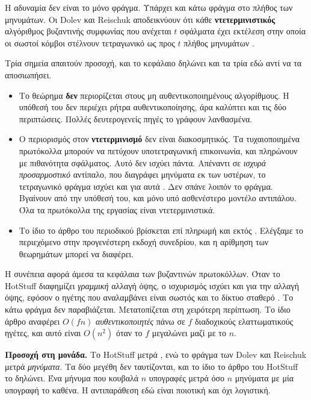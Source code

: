 Η αδυναμία δεν είναι το μόνο φράγμα. Υπάρχει και κάτω φράγμα στο πλήθος
των μηνυμάτων. Οι Dolev και Reischuk αποδεικνύουν ότι κάθε
\textbf{ντετερμινιστικός} αλγόριθμος βυζαντινής συμφωνίας που ανέχεται
$t$ σφάλματα έχει εκτέλεση στην οποία οι σωστοί κόμβοι στέλνουν
τετραγωνικό ως προς $t$ πλήθος μηνυμάτων \cite{dolev1985bounds}.

Τρία σημεία απαιτούν προσοχή, και το κεφάλαιο δηλώνει και τα τρία εδώ
αντί να τα αποσιωπήσει.

\begin{itemize}
  \item Το θεώρημα \textbf{δεν} περιορίζεται στους μη
  αυθεντικοποιημένους αλγορίθμους. Η υπόθεσή του δεν περιέχει ρήτρα
  αυθεντικοποίησης, άρα καλύπτει και τις δύο περιπτώσεις. Πολλές
  δευτερογενείς πηγές το γράφουν λανθασμένα.
  \item Ο περιορισμός στον \textbf{ντετερμινισμό} δεν είναι
  διακοσμητικός. Τα τυχαιοποιημένα πρωτόκολλα μπορούν να πετύχουν
  υποτετραγωνική επικοινωνία, και πληρώνουν με πιθανότητα σφάλματος.
  Αυτό δεν ισχύει πάντα. Απέναντι σε \emph{ισχυρά προσαρμοστικό}
  αντίπαλο, που διαγράφει μηνύματα εκ των υστέρων, το τετραγωνικό φράγμα
  ισχύει και για αυτά \cite{abraham2019ccba}. Δεν σπάνε λοιπόν το
  φράγμα. Βγαίνουν από την υπόθεσή του, και μόνο υπό ασθενέστερο μοντέλο
  αντιπάλου. Όλα τα πρωτόκολλα της εργασίας είναι ντετερμινιστικά.
  \item Το ίδιο το άρθρο του περιοδικού βρίσκεται επί πληρωμή και εκτός
  . Ελέγξαμε το περιεχόμενο στην προγενέστερη εκδοχή
  συνεδρίου, και η αρίθμηση των θεωρημάτων μπορεί να διαφέρει.
\end{itemize}

Η συνέπεια αφορά άμεσα τα κεφάλαια των βυζαντινών πρωτοκόλλων. Όταν το
HotStuff διαφημίζει \emph{γραμμική} αλλαγή όψης, ο ισχυρισμός ισχύει και
για την αλλαγή όψης, εφόσον ο ηγέτης που αναλαμβάνει είναι σωστός και το
δίκτυο σταθερό \cite{yin2019hotstuff}. Το κάτω φράγμα δεν παραβιάζεται.
Μετατοπίζεται στη χειρότερη περίπτωση. Το ίδιο άρθρο αναφέρει $O(fn)$
\emph{αυθεντικοποιητές} πάνω σε $f$ διαδοχικούς ελαττωματικούς ηγέτες,
και αυτό είναι $O(n^{2})$ όταν το $f$ μεγαλώνει μαζί με το $n$.

\textbf{Προσοχή στη μονάδα.} Το HotStuff μετρά , ενώ
το φράγμα των Dolev και Reischuk μετρά \emph{μηνύματα}. Τα δύο μεγέθη
δεν ταυτίζονται, και το ίδιο το άρθρο του HotStuff το δηλώνει. Ένα
μήνυμα που κουβαλά $n$ υπογραφές μετρά όσο $n$ μηνύματα με μία υπογραφή
το καθένα. Η αντιπαράθεση εδώ είναι ποιοτική και όχι λογιστική.

